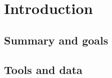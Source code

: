 \section{Introduction}
\subsection*{Summary and goals}
\lipsum[3]

\subsection*{Tools and data}
\lipsum[4]


